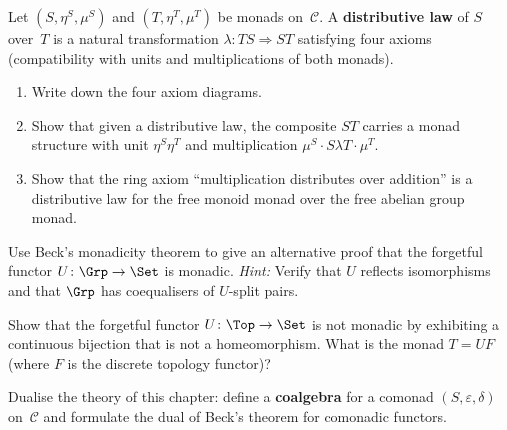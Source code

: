 \begin{exercise}\label{exer:monad-distributive-law}
Let $(S,\eta^S,\mu^S)$ and $(T,\eta^T,\mu^T)$ be monads on~$\mathcal{C}$.
A \textbf{distributive law} of $S$ over~$T$ is a natural transformation
$\lambda\colon TS\Rightarrow ST$ satisfying four axioms (compatibility
with units and multiplications of both monads).
\begin{enumerate}[label=(\alph*)]
\item Write down the four axiom diagrams.
\item Show that given a distributive law, the composite $ST$ carries a
    monad structure with unit $\eta^S\eta^T$ and multiplication
    $\mu^S\cdot S\lambda T\cdot\mu^T$.
\item Show that the ring axiom ``multiplication distributes over
    addition'' is a distributive law for the free monoid monad over
    the free abelian group monad.
\end{enumerate}
\end{exercise}

\begin{exercise}\label{exer:beck-groups}
Use Beck's monadicity theorem to give an alternative proof that the
forgetful functor $U\colon\Grp\to\Set$ is monadic.
\emph{Hint:} Verify that $U$ reflects isomorphisms and that $\Grp$
has coequalisers of $U$-split pairs.
\end{exercise}

\begin{exercise}\label{exer:monadic-top}
Show that the forgetful functor $U\colon\Top\to\Set$ is not monadic by
exhibiting a continuous bijection that is not a homeomorphism.
What is the monad $T = UF$ (where $F$ is the discrete topology functor)?
\end{exercise}

\begin{exercise}\label{exer:comonad-coalgebra}
Dualise the theory of this chapter: define a \textbf{coalgebra} for a
comonad $(S,\varepsilon,\delta)$ on~$\mathcal{C}$ and formulate the
dual of Beck's theorem for comonadic functors.
\end{exercise}

